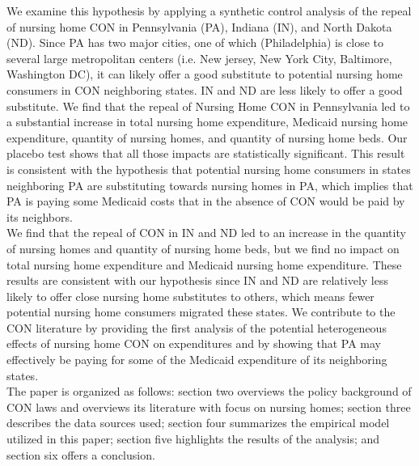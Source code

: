 \documentclass[../Main.tex]{subfiles}
\begin{document}
\indent We examine this hypothesis by applying a synthetic control analysis of the repeal of nursing home CON in Pennsylvania (PA), Indiana (IN), and North Dakota (ND). Since PA has two major cities, one of which (Philadelphia) is close to several large metropolitan centers (i.e. New jersey, New York City, Baltimore, Washington DC), it can likely offer a good substitute to potential nursing home consumers in CON neighboring states. IN and ND are less likely to offer a good substitute. We find that the repeal of Nursing Home CON in Pennsylvania led to a substantial increase in total nursing home expenditure, Medicaid nursing home expenditure, quantity of nursing homes, and quantity of nursing home beds. Our placebo test shows that all those impacts are statistically significant. This result is consistent with the hypothesis that potential nursing home consumers in states neighboring PA are substituting towards nursing homes in PA, which implies that PA is paying some Medicaid costs that in the absence of CON would be paid by its neighbors.\\
\indent We find that the repeal of CON in IN and ND led to an increase in the quantity of nursing homes and quantity of nursing home beds, but we find no impact on total nursing home expenditure and Medicaid nursing home expenditure. These results are consistent with our hypothesis since IN and ND are relatively less likely to offer close nursing home substitutes to others, which means fewer potential nursing home consumers migrated these states. We contribute to the CON literature by providing the first analysis of the potential heterogeneous effects of nursing home CON on expenditures and by showing that PA may effectively be paying for some of the Medicaid expenditure of its neighboring states.\\
\indent The paper is organized as follows: section two overviews the policy background of CON laws and overviews its literature with focus on nursing homes; section three describes the data sources used; section four summarizes the empirical model utilized in this paper; section five highlights the results of the analysis; and section six offers a conclusion.
\end{document}
